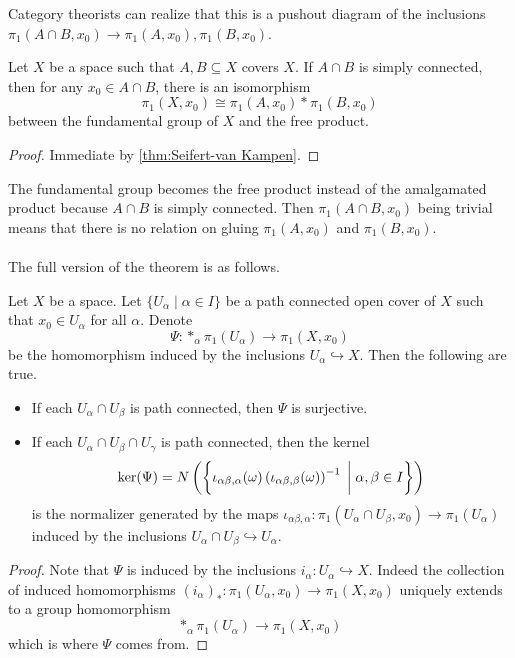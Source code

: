 \documentclass[a4paper]{article}
\begin{document}
Category theorists can realize that this is a pushout diagram of the inclusions $\pi_1(A\cap B,x_0)\to\pi_1(A,x_0),\pi_1(B,x_0)$. 

\begin{crl}{}{} Let $X$ be a space such that $A,B\subseteq X$ covers $X$. If $A\cap B$ is simply connected, then for any $x_0\in A\cap B$, there is an isomorphism $$\pi_1(X,x_0)\cong\pi_1(A,x_0)\ast\pi_1(B,x_0)$$ between the fundamental group of $X$ and the free product. \tcbline
\begin{proof}
Immediate by \ref{thm:Seifert-van Kampen}. 
\end{proof}
\end{crl}

The fundamental group becomes the free product instead of the amalgamated product because $A\cap B$ is simply connected. Then $\pi_1(A\cap B,x_0)$ being trivial means that there is no relation on gluing $\pi_1(A,x_0)$ and $\pi_1(B,x_0)$. \\~\\

The full version of the theorem is as follows. 

\begin{thm}{}{} Let $X$ be a space. Let $\{U_\alpha\;|\;\alpha\in I\}$ be a path connected open cover of $X$ such that $x_0\in U_\alpha$ for all $\alpha$. Denote $$\Psi:\ast_\alpha\pi_1(U_\alpha)\to\pi_1(X,x_0)$$ be the homomorphism induced by the inclusions $U_\alpha\hookrightarrow X$. Then the following are true. 
\begin{itemize}
\item If each $U_\alpha\cap U_\beta$ is path connected, then $\Psi$ is surjective. 
\item If each $U_\alpha\cap U_\beta\cap U_\gamma$ is path connected, then the kernel $$\ker(\Psi)=N\left(\left\{\iota_{\alpha\beta,\alpha}(\omega)\left(\iota_{\alpha\beta,\beta}(\omega)\right)^{-1}\;\bigg{|}\;\alpha,\beta\in I\right\}\right)$$ is the normalizer generated by the maps $\iota_{\alpha\beta,\alpha}:\pi_1(U_\alpha\cap U_\beta,x_0)\to\pi_1(U_\alpha)$ induced by the inclusions $U_\alpha\cap U_\beta\hookrightarrow U_\alpha$. 
\end{itemize} \tcbline
\begin{proof}
Note that $\Psi$ is induced by the inclusions $i_\alpha:U_\alpha\hookrightarrow X$. Indeed the collection of induced homomorphisms $(i_\alpha)_\ast:\pi_1(U_\alpha,x_0)\to\pi_1(X,x_0)$ uniquely extends to a group homomorphism $$\ast_\alpha\pi_1(U_\alpha)\to\pi_1(X,x_0)$$ which is where $\Psi$ comes from. 
\end{proof}
\end{thm}
\end{document}
